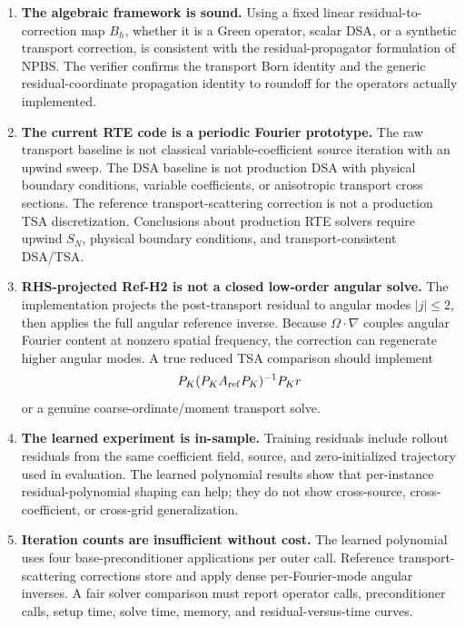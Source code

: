 \documentclass[11pt]{article}
\begin{document}
\begin{enumerate}
\item \textbf{The algebraic framework is sound.}
Using a fixed linear residual-to-correction map \(B_h\), whether it is a Green
operator, scalar DSA, or a synthetic transport correction, is consistent with
the residual-propagator formulation of NPBS.  The verifier confirms the
transport Born identity and the generic residual-coordinate propagation
identity to roundoff for the operators actually implemented.

\item \textbf{The current RTE code is a periodic Fourier prototype.}
The raw transport baseline is not classical variable-coefficient source
iteration with an upwind sweep.  The DSA baseline is not production DSA with
physical boundary conditions, variable coefficients, or anisotropic transport
cross sections.  The reference transport-scattering correction is not a
production TSA discretization.  Conclusions about production RTE solvers require
upwind \(S_N\), physical boundary conditions, and transport-consistent
DSA/TSA.

\item \textbf{RHS-projected Ref-H2 is not a closed low-order angular solve.}
The implementation projects the post-transport residual to angular modes
\(|j|\le2\), then applies the full angular reference inverse.  Because
\(\Omega\cdot\nabla\) couples angular Fourier content at nonzero spatial
frequency, the correction can regenerate higher angular modes.  A true reduced
TSA comparison should implement
\[
  P_K(P_KA_{\rm ref}P_K)^{-1}P_K r
\]
or a genuine coarse-ordinate/moment transport solve.

\item \textbf{The learned experiment is in-sample.}
Training residuals include rollout residuals from the same coefficient field,
source, and zero-initialized trajectory used in evaluation.  The learned
polynomial results show that per-instance residual-polynomial shaping can help;
they do not show cross-source, cross-coefficient, or cross-grid
generalization.

\item \textbf{Iteration counts are insufficient without cost.}
The learned polynomial uses four base-preconditioner applications per outer
call.  Reference transport-scattering corrections store and apply dense
per-Fourier-mode angular inverses.  A fair solver comparison must report
operator calls, preconditioner calls, setup time, solve time, memory, and
residual-versus-time curves.


\end{enumerate}
\end{document}
